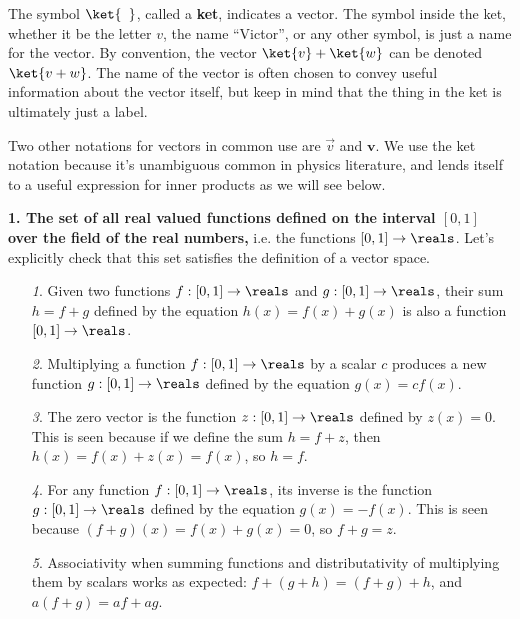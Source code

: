 
The symbol $\ket{\phantom{v}}$, called a \textbf{ket}, indicates a vector.
The symbol inside the ket, whether it be the letter $v$, the name ``Victor'', or any other symbol, is just a name for the vector.
By convention, the vector $\ket{v} + \ket{w}$ can be denoted $\ket{v+w}$.
The name of the vector is often chosen to convey useful information about the vector itself, but keep in mind that the thing in the ket is ultimately just a label.

Two other notations for vectors in common use are $\vec{v}$ and $\mathbf{v}$.
We use the ket notation because it's unambiguous common in physics literature, and lends itself to a useful expression for inner products as we will see below.


\textbf{1. The set of all real valued functions defined on the interval $[0, 1]$ over the field of the real numbers,} i.e. the functions $[0, 1] \to \reals$.
Let's explicitly check that this set satisfies the definition of a vector space.
\begin{enumerate}
  \item[\textit{1}.] Given two functions $f: [0, 1] \to \reals$ and $g: [0, 1] \to \reals$, their sum $h = f + g$ defined by the equation $h(x) = f(x) + g(x)$ is also a function $[0, 1] \to \reals$.
  \item[\textit{2}.] Multiplying a function $f: [0, 1] \to \reals$ by a scalar $c$ produces a new function $g: [0, 1] \to \reals$ defined by the equation $g(x) = c f(x)$.
  \item[\textit{3}.] The zero vector is the function $z:[0, 1] \to \reals$ defined by $z(x) = 0$. This is seen because if we define the sum $h = f + z$, then $h(x) = f(x) + z(x) = f(x)$, so $h = f$.
  \item[\textit{4}.] For any function $f:[0, 1] \to \reals$, its inverse is the function $g:[0, 1] \to \reals$ defined by the equation $g(x) = -f(x)$. This is seen because $(f + g)(x) = f(x) + g(x) = 0$, so $f + g = z$.
  \item[\textit{5}.] Associativity when summing functions and distributativity of multiplying them by scalars works as expected: $f + (g + h) = (f + g) + h$, and $a(f + g) = af + ag$.
\end{enumerate}

